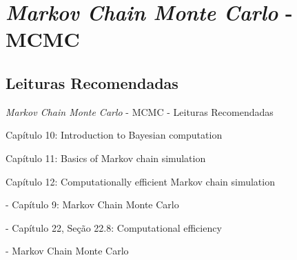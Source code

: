 \section{\textit{Markov Chain Monte Carlo} - MCMC}

\subsection{Leituras Recomendadas}
\begin{frame}{\textit{Markov Chain Monte Carlo} - MCMC - Leituras Recomendadas}
    \begin{vfilleditems}
        \item \textcite{gelman2013bayesian}
        \begin{vfilleditems}
            \item Capítulo 10: Introduction to Bayesian computation
            \item Capítulo 11: Basics of Markov chain simulation
            \item Capítulo 12: Computationally efficient Markov chain simulation
        \end{vfilleditems}
        \item \textcite{mcelreath2020statistical} - Capítulo 9: Markov Chain Monte Carlo
        \item \textcite{neal2011mcmc}
        \item \textcite{betancourtConceptualIntroductionHamiltonian2017}
        \item \textcite{gelman2020regression} - Capítulo 22, Seção 22.8: Computational efficiency
        \item \textcite{storopoli2021estatisticabayesianaR} - Markov Chain Monte Carlo
        \item \textcite{chibUnderstandingMetropolisHastingsAlgorithm1995}
        \item \textcite{casellaExplainingGibbsSampler1992}
    \end{vfilleditems}
\end{frame}

